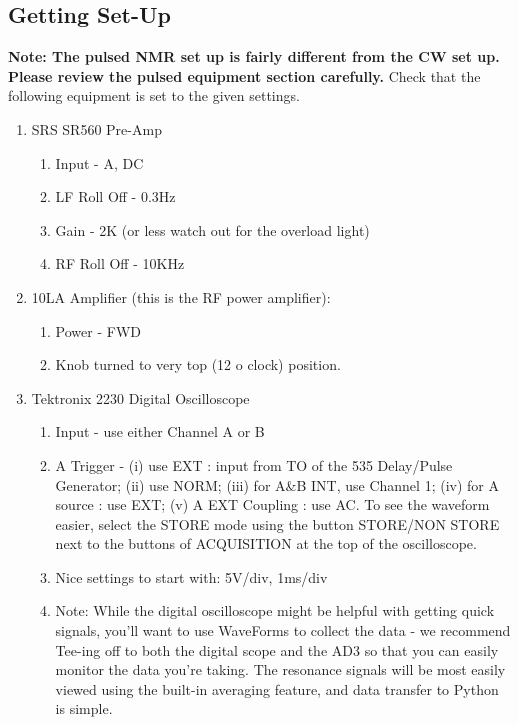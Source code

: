 \documentclass{../lab}
\begin{document}
\subsection{Getting Set-Up}
\textbf{Note: The pulsed NMR set up is fairly different from the CW set up. Please review the pulsed equipment section carefully.}
Check that the following equipment is set to the given settings. 
\begin{enumerate}
    \item SRS SR560 Pre-Amp
    \begin{enumerate}
        \item Input - A, DC
        \item LF Roll Off - 0.3Hz
        \item Gain - 2K (or less watch out for the overload light)
        \item RF Roll Off - 10KHz
    \end{enumerate}
    \item 10LA Amplifier (this is the RF power amplifier):
    \begin{enumerate}
        \item Power - FWD
        \item Knob turned to very top (12 o clock) position.
    \end{enumerate}
    \item Tektronix 2230 Digital Oscilloscope
    \begin{enumerate}
        \item Input - use either Channel A or B
        \item A Trigger - (i) use EXT : input from TO of the 535 Delay/Pulse Generator; (ii) use NORM; (iii) for A\&B INT, use Channel 1; (iv) for A source : use EXT; (v) A EXT Coupling : use AC. To see the waveform easier, select the STORE mode using the button STORE/NON STORE next to the buttons of ACQUISITION at the top of the oscilloscope.
        \item Nice settings to start with: 5V/div, 1ms/div
        \item Note: While the digital oscilloscope might be helpful with getting quick signals, you'll want to use WaveForms to collect the data - we recommend Tee-ing off to both the digital scope and the AD3 so that you can easily monitor the data you're taking. The resonance signals will be most easily viewed using the built-in averaging feature, and data transfer to Python is simple.
    \end{enumerate}
\end{enumerate}
\end{document}
